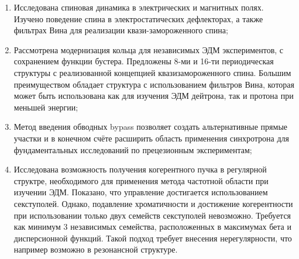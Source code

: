 \begin{enumerate}

\item Исследована спиновая динамика в электрических и магнитных полях. Изучено поведение спина в электростатических дефлекторах, а также фильтрах Вина для реализации квази-замороженного спина;

\item Рассмотрена модернизация кольца для независимых ЭДМ экспериментов, с сохранением функции бустера. Предложены 8-ми и 16-ти периодическая структуры с реализованной концепцией квазизамороженного спина. Большим преимуществом обладает структура с использованием фильтров Вина, которая может быть использована как для изучения ЭДМ дейтрона, так и протона при меньшей энергии;

\item Метод введения обводных bypass позволяет создать альтернативные прямые участки и в конечном счёте расширить область применения синхротрона для фундаментальных исследований по прецезионным экспериментам; 

\item Исследована возможность получения когерентного пучка в регулярной структре, необходимого для применения метода частотной области при изучении ЭДМ. Показано, что управление достигается использованием секступолей. Однако, подавление хроматичности и достижение когерентности при использовании только двух семейств секступолей невозможно. Требуется как минимум 3 независимых семейства, расположенных в максимумах бета и дисперсионной функций. Такой подход требует внесения нерегулярности, что например возможно в резонансной структуре.

\end{enumerate}

\FloatBarrier
